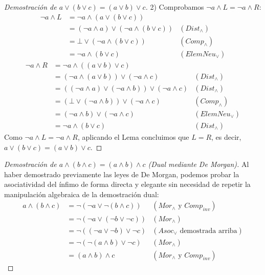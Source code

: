 {\begin{proof}[Demostración de $a \vee (b \vee c) = (a \vee b) \vee c$]
2) Comprobamos $\neg a \wedge L = \neg a \wedge R$:
\begin{align*}
    \neg a \wedge L &= \neg a \wedge (a \vee (b \vee c)) \\
                    &= (\neg a \wedge a) \vee (\neg a \wedge (b \vee c)) & (Dist_\wedge) \\
                    &= \bot \vee (\neg a \wedge (b \vee c)) & (Comp_\wedge) \\
                    &= \neg a \wedge (b \vee c) & (ElemNeu_\vee)
\end{align*}
\begin{align*}
    \neg a \wedge R &= \neg a \wedge ((a \vee b) \vee c) \\
                    &= (\neg a \wedge (a \vee b)) \vee (\neg a \wedge c) & (Dist_\wedge) \\
                    &= ((\neg a \wedge a) \vee (\neg a \wedge b)) \vee (\neg a \wedge c) & (Dist_\wedge) \\
                    &= (\bot \vee (\neg a \wedge b)) \vee (\neg a \wedge c) & (Comp_\wedge) \\
                    &= (\neg a \wedge b) \vee (\neg a \wedge c) & (ElemNeu_\vee) \\
                    &= \neg a \wedge (b \vee c) & (Dist_\wedge)
\end{align*}
Como $\neg a \wedge L = \neg a \wedge R$, aplicando el Lema concluimos que $L = R$, es decir, $a \vee (b \vee c) = (a \vee b) \vee c$.
\end{proof}

\begin{proof}[Demostración de $a \wedge (b \wedge c) = (a \wedge b) \wedge c$ (Dual mediante De Morgan)]
Al haber demostrado previamente las leyes de De Morgan, podemos probar la asociatividad del ínfimo de forma directa y elegante sin necesidad de repetir la manipulación algebraica de la demostración dual:
\begin{align*}
    a \wedge (b \wedge c) &= \neg (\neg a \vee \neg (b \wedge c)) & (Mor_\wedge \text{ y } Comp_{inv}) \\
                          &= \neg (\neg a \vee (\neg b \vee \neg c)) & (Mor_\wedge) \\
                          &= \neg ((\neg a \vee \neg b) \vee \neg c) & (Asoc_\vee \text{ demostrada arriba}) \\
                          &= \neg (\neg (a \wedge b) \vee \neg c) & (Mor_\wedge) \\
                          &= (a \wedge b) \wedge c & (Mor_\wedge \text{ y } Comp_{inv})
\end{align*}
\end{proof}
}

